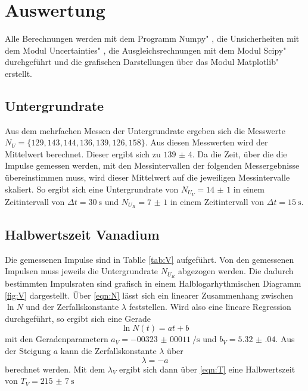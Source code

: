 \section{Auswertung}
\label{sec:Auswertung}

Alle Berechnungen werden mit dem Programm \glqq Numpy" \cite{numpy}, die Unsicherheiten mit dem Modul \glqq Uncertainties" \cite{uncertainties}, die Ausgleichsrechnungen mit dem Modul \glqq Scipy" \cite{scipy} durchgeführt und die grafischen Darstellungen über das Modul \glqq Matplotlib" \cite{matplotlib} erstellt.

\subsection{Untergrundrate}

Aus dem mehrfachen Messen der Untergrundrate ergeben sich die Messwerte $N_U=\{ 129, 143, 144, 136, 139, 126, 158 \}$. Aus diesen Messwerten wird der Mittelwert berechnet. Dieser ergibt sich zu $\num{139(4)}$. Da die Zeit, über die die Impulse gemessen werden, mit den Messintervallen der folgenden Messergebnisse übereinstimmen muss, wird  dieser Mittelwert auf die jeweiligen Messintervalle skaliert. So ergibt sich eine Untergrundrate von $N_{U_V}=\num{14(1)}$ in einem Zeitintervall von $\Delta t=\SI{30}{\s}$ und $N_{U_R}=\num{7(1)}$ in einem Zeitintervall von $\Delta t=\SI{15}{\s}$.

\subsection{Halbwertszeit Vanadium}
\label{Vanadium}

Die gemessenen Impulse sind in Tablle \ref{tab:V} aufgeführt. Von den gemessenen Impulsen muss jeweils die Untergrundrate $N_{U_R}$ abgezogen werden. Die dadurch bestimmten Impulsraten sind grafisch in einem Halblogarhythmischen Diagramm \ref{fig:V} dargestellt. Über \eqref{eqn:N} lässt sich ein linearer Zusammenhang zwischen $\ln{N}$ und der Zerfallskonstante $\lambda $ feststellen. Wird also eine lineare Regression durchgeführt, so ergibt sich eine Gerade
\begin{equation}
    \ln{N}(t)=at + b
    \label{eqn:gerade}
\end{equation}
mit den Geradenparametern $a_V=\SI[per-mode=reciprocal]{-00323(00011)}{\per\s}$ und $b_V=\num{5.32(04)}$. 
Aus der Steigung $a$ kann die Zerfallskonstante $\lambda$ über
\begin{equation}
    \lambda=-a
\label{eqn:lamb}
\end{equation}
berechnet werden. Mit dem $\lambda_V$ ergibt sich dann über \eqref{eqn:T} eine Halbwertszeit von $T_V=\SI{215(7)}{\s}$


